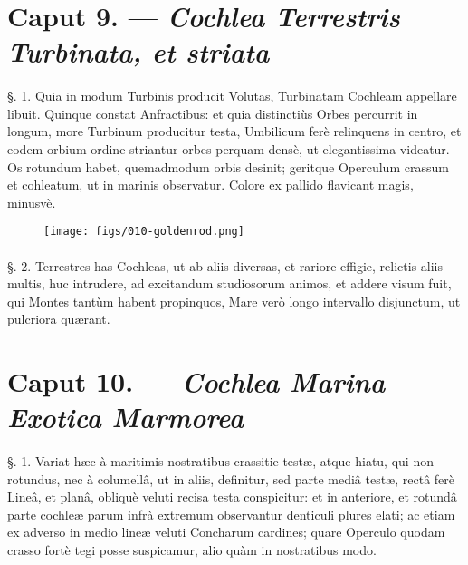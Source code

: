 \documentclass[a4paper, 11pt, oneside, polutonikogreek, german]{article}
\begin{document}
\paragraph{}
\section{Caput 9. --- \emph{Cochlea Terrestris Turbinata, et striata}}
\paragraph{}
§. 1. Quia in modum Turbinis producit Volutas, Turbinatam Cochleam appellare libuit. Quinque constat Anfractibus: et quia distinctiùs Orbes percurrit in longum, more Turbinum producitur testa, Umbilicum ferè relinquens in centro, et eodem orbium ordine striantur orbes perquam densè, ut elegantissima videatur. Os rotundum habet, quemadmodum orbis desinit; geritque Operculum crassum et cohleatum, ut in marinis observatur. Colore ex pallido flavicant magis, minusvè.

\begin{figure}[H]
\centering
\texttt{[image: figs/010-goldenrod.png]}

\end{figure}
\paragraph{}
§. 2. Terrestres has Cochleas, ut ab aliis diversas, et rariore effigie, relictis aliis multis, huc intrudere, ad excitandum studiosorum animos, et addere visum fuit, qui Montes tantùm habent propinquos, Mare verò longo intervallo disjunctum, ut pulcriora quærant.

\section{Caput 10. --- \emph{Cochlea Marina Exotica Marmorea}}
\paragraph{}
§. 1. Variat hæc à maritimis nostratibus crassitie testæ, atque hiatu, qui non rotundus, nec à columellâ, ut in aliis, definitur, sed parte mediâ testæ, rectâ ferè Lineâ, et planâ, obliquè veluti recisa testa conspicitur: et in anteriore, et rotundâ parte cochleæ parum infrà extremum observantur denticuli plures elati; ac etiam ex adverso in medio lineæ veluti Concharum cardines; quare Operculo quodam crasso fortè tegi posse suspicamur, alio quàm in nostratibus modo.
\end{document}
